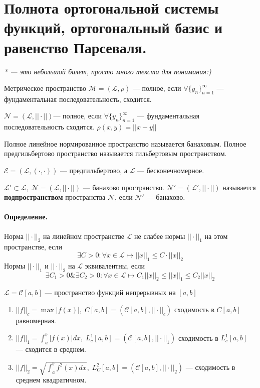 \section{Полнота ортогональной системы функций, ортогональный базис и равенство Парсеваля.}
\textit{* --- это небольшой билет, просто много текста для понимания:)}

Метрическое пространство $ \mathcal{M} = (\mathcal{L}, \rho) $ --- полное, если $ \forall \{ y_n \}^\infty_{n=1}  $ --- фундаментальная последовательность, сходится.

$ \mathcal{N} =  (\mathcal{L}, ||\cdot||) $--- полное, если $ \forall \{ y_n \}^\infty_{n=1} $ --- фундаментальная последовательность сходится. $ \rho(x,y) = ||x - y|| $

\begin{greyDefinition} Полное линейное нормированное пространство называется банаховым. Полное предгильбертово пространство называется гильбертовым пространством. 
\end{greyDefinition}
$ \mathcal{E} = (\mathcal{L}, (\cdot,\cdot)) $ --- предгильбертово, а $ \mathcal{L}  $ --- бесконечномерное.
\begin{greyDefinition}
$ \mathcal{L}' \subset \mathcal{L},\; \mathcal{N} = (\mathcal{L}, ||\cdot||) $ --- банахово пространство. $ \mathcal{N}' = (\mathcal{L}', ||\cdot||)$ называется \textbf{подпространством} пространства $ \mathcal{N} $, если $ \mathcal{N}' $ --- банахово.
\end{greyDefinition}
\paragraph{Определение.} Норма $ ||\cdot||_2$ на линейном пространстве $ \mathcal{L} $ не слабее нормы $ ||\cdot||_1 $ на этом пространстве, если 
\[
\exists C>0:\forall x\in \mathcal{L} \mapsto ||x||_1 \leqslant C\cdot ||x||_2
\]
Нормы $ ||\cdot||_1 $ и $ ||\cdot||_2 $ на $ \mathcal{L} $ эквивалентны, если \[
\exists C_1 > 0 \& \exists C_2>0: \forall x \in \mathcal{L} \mapsto C_1||x||_2 \leqslant ||x||_1 \leqslant C_2||x||_2
\]
\begin{greyDefinition}
$ \mathcal{L} = \mathcal{C} [a,b] $ --- пространство функций непрерывных на $ [a,b] $
\begin{enumerate}
	\item $ ||f||_c = \max |f(x)|,\; C[a,b] = (\mathcal{C}[a,b], ||\cdot||_c) $ сходимость в $ C[a,b] $ равномерная.
	\item $ ||f||_1 = \int_{a}^{b}|f(x)|dx,\; L_c^1[a,b] =(\mathcal{C}[a,b], ||\cdot||_1) $ сходимость в $ L_c^1[a,b] $ --- сходится в среднем.
	\item $ ||f||_2 = \sqrt{\int_{a}^{b}f^2(x)dx},\; L_C^2[a,b] = (\mathcal{C}[a,b], ||\cdot||_2) $ --- сходимость в среднем квадратичном.
\end{enumerate}
\end{greyDefinition}
\newpage
